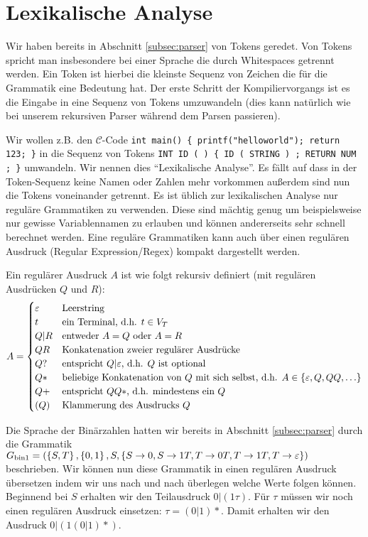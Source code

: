 \section{Lexikalische Analyse}
Wir haben bereits in Abschnitt \ref{subsec:parser} von Tokens geredet. Von Tokens spricht man insbesondere bei einer Sprache die durch Whitespaces getrennt werden. Ein Token ist hierbei die kleinste Sequenz von Zeichen die für die Grammatik eine Bedeutung hat.
Der erste Schritt der Kompiliervorgangs ist es die Eingabe in eine Sequenz von Tokens umzuwandeln (dies kann natürlich wie bei unserem rekursiven Parser während dem Parsen passieren).

Wir wollen z.B. den $\mathcal{C}$-Code \verb|int main() { printf("helloworld"); return 123; }| in die Sequenz von Tokens \verb|INT ID ( ) { ID ( STRING ) ; RETURN NUM ; }| umwandeln. Wir nennen dies ``Lexikalische Analyse''. Es fällt auf dass in der Token-Sequenz keine Namen oder Zahlen mehr vorkommen außerdem sind nun die Tokens
voneinander getrennt.
Es ist üblich zur lexikalischen Analyse nur reguläre Grammatiken zu verwenden. Diese sind mächtig genug um beispielsweise nur gewisse Variablennamen zu erlauben
und können andererseits sehr schnell berechnet werden.
Eine reguläre Grammatiken kann auch über einen regulären Ausdruck (Regular Expression/Regex) kompakt dargestellt werden.

\begin{defn}
Ein regulärer Ausdruck $A$ ist wie folgt rekursiv definiert (mit regulären Ausdrücken $Q$ und $R$):
\[A = \begin{cases}
\varepsilon & \text{Leerstring} \\
t & \text{ein Terminal, d.h. $t \in V_T$} \\
Q|R & \text{entweder $A=Q$ oder $A=R$} \\
QR & \text{Konkatenation zweier regulärer Ausdrücke} \\
Q? & \text{entspricht $Q|\varepsilon$, d.h. $Q$ ist optional} \\
Q* & \text{beliebige Konkatenation von $Q$ mit sich selbst, d.h. $A \in \left\{\varepsilon,Q,QQ,\ldots\right\}$} \\
Q+ & \text{entspricht $QQ*$, d.h. mindestens ein $Q$} \\
(Q) & \text{Klammerung des Ausdrucks $Q$}
\end{cases}\]
\end{defn}

Die Sprache der Binärzahlen hatten wir bereits in Abschnitt \ref{subsec:parser} durch die Grammatik $G_{\text{bin1}}=(\left\{S,T\right\},\left\{0,1\right\},S,\left\{S \to 0,S \to 1T, T \to 0T, T \to 1T, T \to \varepsilon\right\})$
beschrieben. Wir können nun diese Grammatik in einen regulären Ausdruck übersetzen indem wir uns nach und nach überlegen welche Werte folgen können.
Beginnend bei $S$ erhalten wir den Teilausdruck $0|(1\tau)$. Für $\tau$ müssen wir noch einen regulären Ausdruck einsetzen: $\tau=(0|1)*$.
Damit erhalten wir den Ausdruck $0|(1(0|1)*)$.

